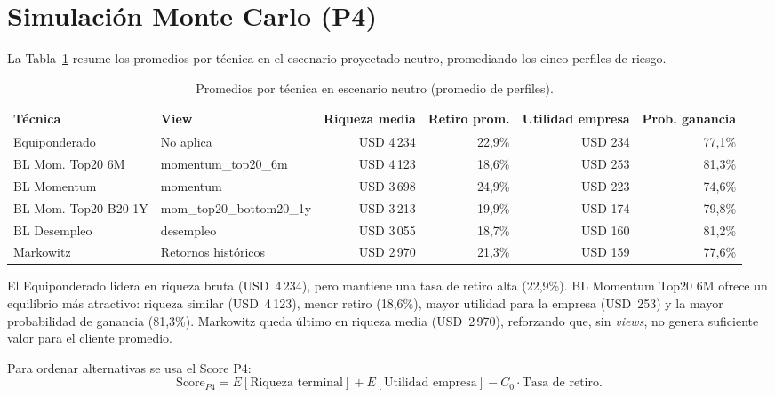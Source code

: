 \section{Simulaci\'on Monte Carlo (P4)}

La Tabla~\ref{tab:p4_neutro} resume los promedios por t\'ecnica en el escenario proyectado neutro, promediando los cinco perfiles de riesgo.

\begin{table}[h]
\centering
\caption{Promedios por t\'ecnica en escenario neutro (promedio de perfiles).}
\label{tab:p4_neutro}
\scriptsize
\begin{tabular}{@{}llrrrr@{}}
\toprule
T\'ecnica & View & Riqueza media & Retiro prom. & Utilidad empresa &
Prob. ganancia \\
\midrule
Equiponderado & No aplica & USD 4\,234 & 22,9\% & USD 234 & 77,1\% \\
BL Mom. Top20 6M & momentum\_top20\_6m & USD 4\,123 & 18,6\% & USD 253 &
81,3\% \\
BL Momentum & momentum & USD 3\,698 & 24,9\% & USD 223 & 74,6\% \\
BL Mom. Top20-B20 1Y & mom\_top20\_bottom20\_1y & USD 3\,213 & 19,9\% &
USD 174 & 79,8\% \\
BL Desempleo & desempleo & USD 3\,055 & 18,7\% & USD 160 & 81,2\% \\
Markowitz & Retornos hist\'oricos & USD 2\,970 & 21,3\% & USD 159 &
77,6\% \\
\bottomrule
\end{tabular}
\end{table}

El Equiponderado lidera en riqueza bruta (USD~4\,234), pero mantiene una tasa de retiro alta (22,9\%). BL Momentum Top20 6M ofrece un equilibrio m\'as atractivo: riqueza similar (USD~4\,123), menor retiro (18,6\%), mayor utilidad para la empresa (USD~253) y la mayor probabilidad de ganancia (81,3\%). Markowitz queda \'ultimo en riqueza media (USD~2\,970), reforzando que, sin \textit{views}, no genera suficiente valor para el cliente promedio.

Para ordenar alternativas se usa el Score P4:
\begin{equation}
\text{Score}_{P4} =
E[\text{Riqueza terminal}]
+ E[\text{Utilidad empresa}]
- C_0 \cdot \text{Tasa de retiro}.
\end{equation}

